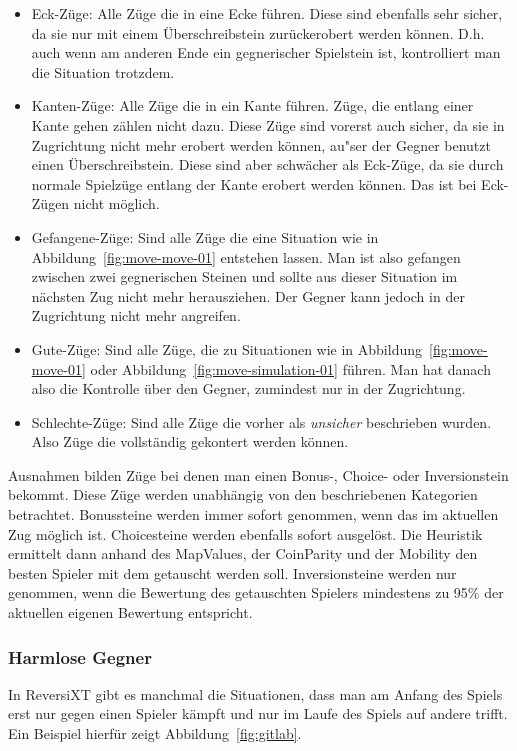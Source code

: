 \begin{itemize}
    \item Eck-Z\"uge: Alle Z\"uge die in eine Ecke f\"uhren.
        Diese sind ebenfalls sehr sicher, da sie nur mit einem \"Uberschreibstein zur\"uckerobert werden k\"onnen.
        D.h. auch wenn am anderen Ende ein gegnerischer Spielstein ist, kontrolliert man die Situation trotzdem.
    \item Kanten-Z\"uge: Alle Z\"uge die in ein Kante f\"uhren.
        Z\"uge, die entlang einer Kante gehen z\"ahlen nicht dazu.
        Diese Z\"uge sind vorerst auch sicher, da sie in Zugrichtung nicht mehr erobert werden k\"onnen, au"ser der Gegner benutzt einen \"Uberschreibstein.
        Diese sind aber schw\"acher als Eck-Z\"uge, da sie durch normale Spielz\"uge entlang der Kante erobert werden k\"onnen.
        Das ist bei Eck-Z\"ugen nicht m\"oglich.
    \item Gefangene-Z\"uge: Sind alle Z\"uge die eine Situation wie in Abbildung~\ref{fig:move-move-01} entstehen lassen.
        Man ist also gefangen zwischen zwei gegnerischen Steinen und sollte aus dieser Situation im n\"achsten Zug nicht mehr herausziehen.
        Der Gegner kann jedoch in der Zugrichtung nicht mehr angreifen.
    \item Gute-Z\"uge: Sind alle Z\"uge, die zu Situationen wie in Abbildung~\ref{fig:move-move-01} oder Abbildung~\ref{fig:move-simulation-01} f\"uhren.
        Man hat danach also die Kontrolle \"uber den Gegner, zumindest nur in der Zug\-rich\-tung.
    \item Schlechte-Z\"uge: Sind alle Z\"uge die vorher als \textit{unsicher} beschrieben wurden.
        Also Z\"uge die vollst\"andig gekontert werden k\"onnen.
\end{itemize}
\vspace{1em}

Ausnahmen bilden Z\"uge bei denen man einen Bonus-, Choice- oder Inversionstein bekommt.
Diese Z\"uge werden unabh\"angig von den beschriebenen Kategorien betrachtet.
Bonussteine werden immer sofort genommen, wenn das im aktuellen Zug m\"oglich ist.
Choicesteine werden ebenfalls sofort ausgel\"ost.
Die Heuristik ermittelt dann anhand des MapValues, der CoinParity und der Mobility den besten Spieler mit dem getauscht werden soll.
Inversionsteine werden nur genommen, wenn die Bewertung des getauschten Spielers mindestens zu 95\% der aktuellen eigenen Bewertung entspricht.

\subsubsection{Harmlose Gegner}
In ReversiXT gibt es manchmal die Situationen, dass man am Anfang des Spiels erst nur gegen einen Spieler k\"ampft und nur im Laufe des Spiels auf andere trifft.
Ein Beispiel hierf\"ur zeigt Abbildung~\ref{fig:gitlab}.

